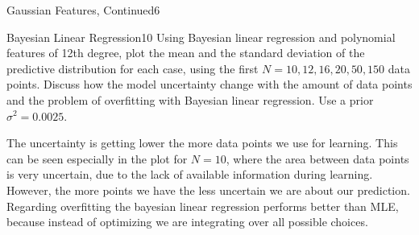 \begin{questions}
\begin{question}{Gaussian Features, Continued}{6}
\begin{answer}\end{answer}

\end{question}


\begin{question}{Bayesian Linear Regression}{10}
Using Bayesian linear regression and polynomial features of 12th degree, plot the mean and the standard deviation of the predictive distribution for each case, using the first $N={10, 12, 16, 20, 50, 150}$ data points.
Discuss how the model uncertainty change with the amount of data points and the problem of overfitting with Bayesian linear regression. Use a prior $\sigma^2=0.0025$.

\begin{answer}
The uncertainty is getting lower the more data points we use for learning. This can be seen especially in the plot for $N=10$, where the area between data points is very uncertain, due to the lack of available information during learning. However, the more points we have the less uncertain we are about our prediction. Regarding overfitting the bayesian linear regression performs better than MLE, because instead of optimizing we are integrating over all possible choices.


\end{answer}
\end{question}
\end{questions}

